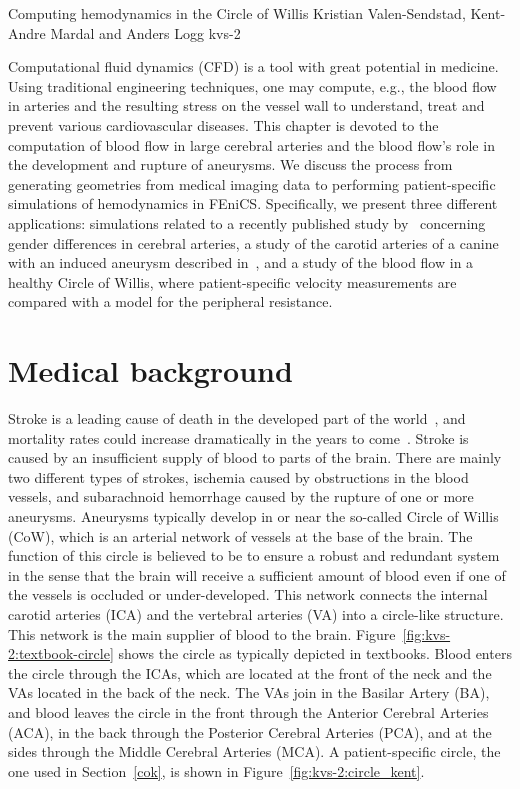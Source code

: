              {Computing hemodynamics in the Circle of Willis}
              {Kristian Valen-Sendstad, Kent-Andre Mardal and Anders Logg}
              {kvs-2}

Computational fluid dynamics (CFD) is a tool with great potential in
medicine. Using traditional engineering techniques, one may compute,
e.g., the blood flow in arteries and the resulting stress on the
vessel wall to understand, treat and prevent various cardiovascular
diseases. This chapter is devoted to the computation of blood flow in
large cerebral arteries and the blood flow's role in the development 
and rupture of
aneurysms. We discuss the process from generating geometries from
medical imaging data to performing patient-specific simulations of
hemodynamics in FEniCS.  Specifically, we present three different
applications: simulations related to a recently published study
by~\citet{LindekleivValen-SendstadMorganEtAl2010} concerning gender
differences in cerebral arteries, a study of the carotid arteries of a
canine with an induced aneurysm described
in~\citet{JiangJohnsonValen-SendstadEtAl2010}, and a study of the blood
flow in a healthy Circle of Willis, where patient-specific velocity
measurements are compared with a model for the peripheral resistance.

\section{Medical background} \label{Medical_Background}

Stroke is a leading cause of death in the developed part of the
world~\citep{Feigin2005}, and mortality rates could increase
dramatically in the years to come~\citep{MurrayLopez1997}. Stroke is
caused by an insufficient supply of blood to parts of the brain. There
are mainly two different types of strokes, ischemia caused by
obstructions in the blood vessels, and subarachnoid hemorrhage caused
by the rupture of one or more aneurysms. Aneurysms
typically develop in or near the so-called Circle of Willis (CoW),
which is an arterial network of vessels at the base of the brain. The
function of this circle is believed to be to ensure a robust and
redundant system in the sense that the brain will receive a sufficient
amount of blood even if one of the vessels is occluded or
under-developed. This network connects the internal carotid arteries
(ICA) and the vertebral arteries (VA) into a circle-like
structure. This network is the main supplier of blood to the
brain. Figure~\ref{fig:kvs-2:textbook-circle} shows the circle as
typically depicted in textbooks. Blood enters the circle through the
ICAs, which are located at the front of the neck and the VAs located
in the back of the neck.  The VAs join in the Basilar Artery (BA), and
blood leaves the circle in the front through the Anterior Cerebral
Arteries (ACA), in the back through the Posterior Cerebral Arteries
(PCA), and at the sides through the Middle Cerebral Arteries (MCA). A
patient-specific circle, the one used in Section~\ref{cok}, is shown
in Figure~\ref{fig:kvs-2:circle_kent}.

